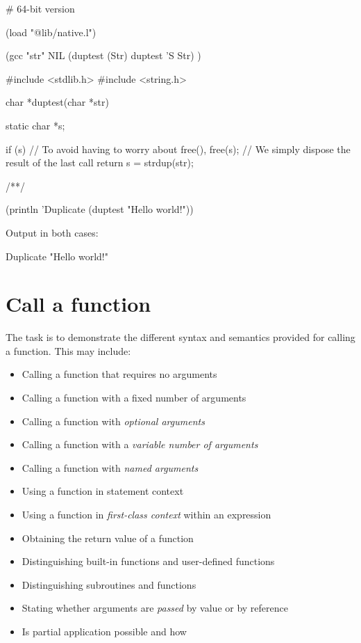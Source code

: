 \begin{wideverbatim}

# 64-bit version

(load "@lib/native.l")

(gcc "str" NIL
   (duptest (Str) duptest 'S Str) )

#include <stdlib.h>
#include <string.h>

char *duptest(char *str) {
   static char *s;

   if (s)         // To avoid having to worry about free(),
      free(s);    // We simply dispose the result of the last call
   return s = strdup(str);
}
/**/

(println 'Duplicate (duptest "Hello world!"))

Output in both cases:

Duplicate "Hello world!"

\end{wideverbatim}

\pagebreak{}
\section*{Call a function}

The task is to demonstrate the different syntax and semantics provided
for calling a function. This may include:

\begin{itemize}
\item
  Calling a function that requires no arguments
\item
  Calling a function with a fixed number of arguments
\item Calling a function with \emph{optional arguments}
\item Calling a function with a \emph{variable number of arguments}
\item Calling a function with \emph{named arguments}
\item
  Using a function in statement context
\item Using a function in \emph{first-class context} within an
  expression
\item
  Obtaining the return value of a function
\item
  Distinguishing built-in functions and user-defined functions
\item
  Distinguishing subroutines and functions
\item Stating whether arguments are \emph{passed} by value or by
  reference
\item
  Is partial application possible and how
\end{itemize}

